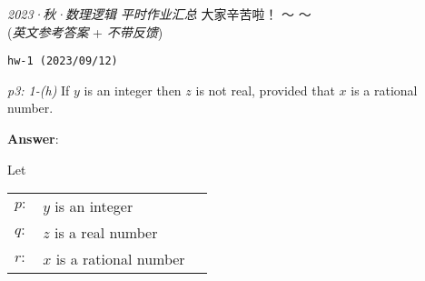 \documentclass[UTF8,12pt,a4paper]{ctexart}
\begin{document}

\begin{center}
	\textit{2023·秋·数理逻辑} \qquad \textit{平时作业汇总}  \qquad 大家辛苦啦！  \faCoffee ～ ～ \\
	(\textit{英文参考答案} + \textit{不带反馈})
\end{center}


\noindent\texttt{hw-1 (2023/09/12) }

\emph{p3: 1-(h)} \quad
If $y$ is an integer then $z$ is not real, provided that $x$ is a rational number.


\noindent\textbf{Answer}:

Let
\begin{center}
	\begin{tabular}{l l l }
 $p:$ & $y$ is an integer  \\
 $q:$ & $z$ is a real number  \\
 $r:$ & $x$ is a rational number 
\end{tabular}
\end{center}
\end{document}
